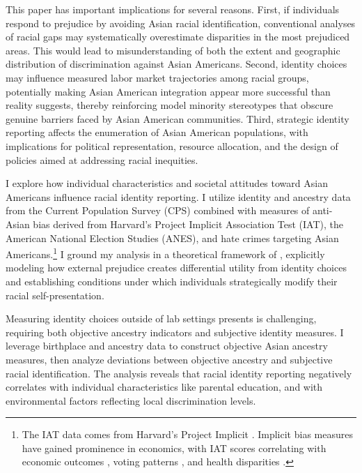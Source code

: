 This paper has important implications for several reasons. First, if individuals respond to prejudice by avoiding Asian racial identification, conventional analyses of racial gaps may systematically overestimate disparities in the most prejudiced areas. This would lead to misunderstanding of both the extent and geographic distribution of discrimination against Asian Americans. Second, identity choices may influence measured labor market trajectories among racial groups, potentially making Asian American integration appear more successful than reality suggests, thereby reinforcing model minority stereotypes that obscure genuine barriers faced by Asian American communities. Third, strategic identity reporting affects the enumeration of Asian American populations, with implications for political representation, resource allocation, and the design of policies aimed at addressing racial inequities.

I explore how individual characteristics and societal attitudes toward Asian Americans influence racial identity reporting. I utilize identity and ancestry data from the Current Population Survey (CPS) combined with measures of anti-Asian bias derived from Harvard's Project Implicit Association Test (IAT), the American National Election Studies (ANES), and hate crimes targeting Asian Americans.\footnote{The IAT data comes from Harvard's Project Implicit \autocite{greenwaldMeasuringIndividualDifferences1998}. Implicit bias measures have gained prominence in economics, with IAT scores correlating with economic outcomes \autocite{chettyRaceEconomicOpportunity2020,gloverDiscriminationSelfFulfillingProphecy2017}, voting patterns \autocite{friesePredictingVotingBehavior2007}, and health disparities \autocite{leitnerRacialBiasAssociated2016}.} I ground my analysis in a theoretical framework of \textcite{akerlofEconomicsIdentity2000}, explicitly modeling how external prejudice creates differential utility from identity choices and establishing conditions under which individuals strategically modify their racial self-presentation.

Measuring identity choices outside of lab settings presents is challenging, requiring both objective ancestry indicators and subjective identity measures. I leverage birthplace and ancestry data to construct objective Asian ancestry measures, then analyze deviations between objective ancestry and subjective racial identification. The analysis reveals that racial identity reporting negatively correlates with individual characteristics like parental education, and with environmental factors reflecting local discrimination levels.


